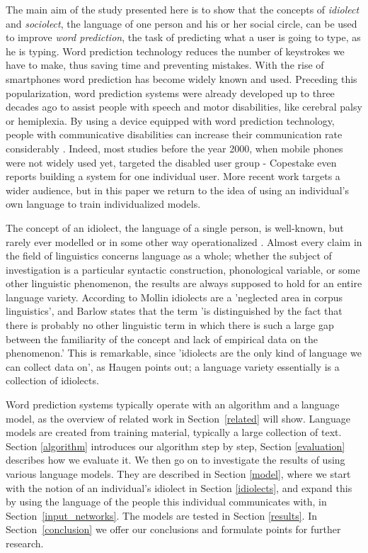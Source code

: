 \documentclass[12pt]{article}
\begin{document}
The main aim of the study presented here is to show that the concepts of \emph{idiolect} and \emph{sociolect}, the language of one person and his or her social circle, can be used to improve \emph{word prediction}, the task of predicting what a user is going to type, as he is typing. Word prediction technology reduces the number of keystrokes we have to make, thus saving time and preventing mistakes. With the rise of smartphones word prediction has become widely known and used. Preceding this popularization, word prediction systems were already developed up to three decades ago to assist people with speech and motor disabilities, like cerebral palsy or hemiplexia. By using a device equipped with word prediction technology, people with communicative disabilities can increase their communication rate considerably \cite{Garay-Vitoria+06}. Indeed, most studies before the year 2000, when mobile phones were not widely used yet, targeted the disabled user group - Copestake \citeyear{copestake97} even reports building a system for one individual user. More recent work targets a wider audience, but in this paper we return to the idea of using an individual's own language to train individualized models.

The concept of an idiolect, the language of a single person, is well-known, but rarely ever modelled or in some other way operationalized \cite{mollin09,barlow10,louwerse04}. Almost every claim in the field of linguistics concerns language as a whole; whether the subject of investigation is a particular syntactic construction, phonological variable, or some other linguistic phenomenon, the results are always supposed to hold for an entire language variety. According to Mollin \citeyear{mollin09} idiolects are a 'neglected area in corpus linguistics', and Barlow \citeyear{barlow10} states that the term 'is distinguished by the fact that there is probably no other linguistic term in which there is such a large gap between the familiarity of the concept and lack of empirical data on the phenomenon.' This is remarkable, since 'idiolects are the only kind of language we can collect data on', as Haugen \citeyear{Haugen72} points out; a language variety essentially is a collection of idiolects.

Word prediction systems typically operate with an algorithm and a language model, as the overview of related work in Section~\ref{related} will show. Language models are created from training material, typically a large collection of text. Section \ref{algorithm} introduces our algorithm step by step, Section \ref{evaluation} describes how we evaluate it. We then go on to investigate the results of using various language models. They are described in Section \ref{model}, where we start with the notion of an individual's idiolect in Section \ref{idiolects}, and expand this by using the language of the people this individual communicates with, in Section~\ref{input_networks}. The models are tested in Section \ref{results}. In Section~\ref{conclusion} we offer our conclusions and formulate points for further research.
\end{document}
